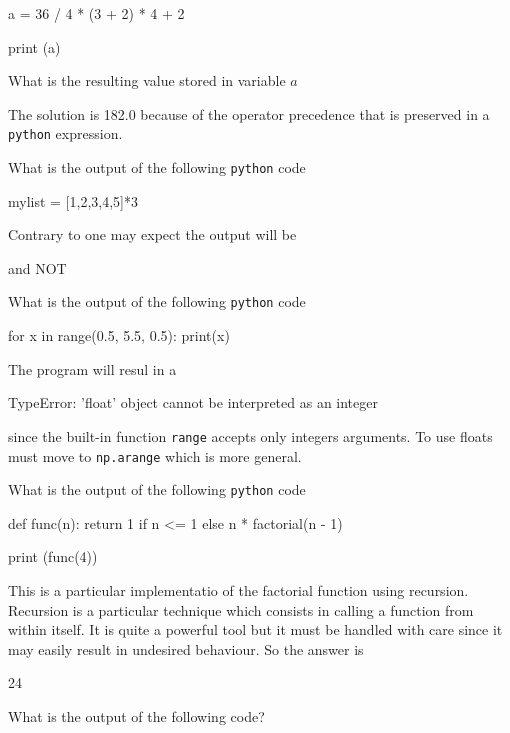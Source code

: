 \documentclass[12pt,a4paper]{exam}
\begin{document}
\begin{questions}
\begin{ipython}
a = 36 / 4 * (3 +  2) * 4 + 2

print (a)
\end{ipython}

What is the resulting value stored in variable $a$

\begin{checkboxes}
\end{checkboxes}
\begin{solution}
  The solution is 182.0 because of the operator precedence that is preserved in a \texttt{python} expression.
\end{solution}
\question
What is the output of the following \texttt{python} code

\begin{ipython}
mylist = [1,2,3,4,5]*3
\end{ipython}
\fillwithlines{3cm}
\begin{solution}
Contrary to one may expect the output will be
\begin{ioutput}
[1,2,3,4,5,1,2,3,4,5,1,2,3,4,5]
\end{ioutput}
and NOT
\begin{ioutput}
[3,6,9,12,15]
\end{ioutput}
\end{solution}
\question
What is the output of the following \texttt{python} code

\begin{ipython}
for x in range(0.5, 5.5, 0.5):
    print(x)
\end{ipython}
\fillwithlines{3cm}
\begin{solution}
The program will resul in a
\begin{ioutput}
TypeError: 'float' object cannot be interpreted as an integer
\end{ioutput}
since the built-in function \texttt{range} accepts only integers arguments. To use floats must move to \texttt{np.arange} which is more general.
\end{solution}
\question
What is the output of the following \texttt{python} code

\begin{ipython}
def func(n):
    return 1 if n <= 1 else n * factorial(n - 1)

print (func(4))
\end{ipython}
\fillwithlines{3cm}
\begin{solution}
This is a particular implementatio of the factorial function using recursion. Recursion is a particular technique which consists in
calling a function from within itself. It is quite a powerful tool but it must be handled with care since it may easily result in
undesired behaviour. So the answer is
\begin{ioutput}
24
\end{ioutput}
\end{solution}
\question
What is the output of the following code?


\end{questions}
\end{document}
